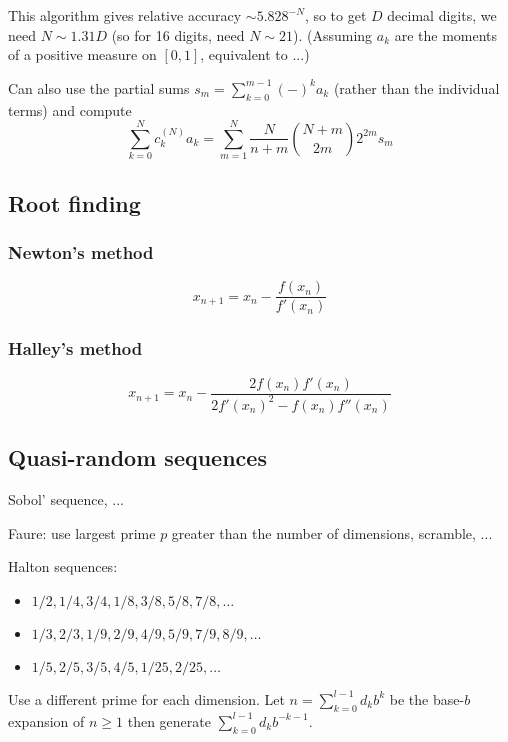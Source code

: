 \documentclass[10pt,dvipdfmx,letterpaper,twoside]{article}
\begin{document}
This algorithm gives relative accuracy $\sim 5.828^{-N}$, so to get $D$ decimal digits,
we need $N\sim 1.31 D$ (so for 16 digits, need $N\sim21$).  (Assuming $a_k$ are the moments
of a positive measure on $[0,1]$, equivalent to ...)

Can also use the partial sums $s_m=\sum_{k=0}^{m-1}(-)^k a_k$ (rather than the individual terms) and compute
\[ \sum_{k=0}^N c^{(N)}_k a_k = \sum_{m=1}^N \frac{N}{n+m}\binom{N+m}{2m} 2^{2m} s_m \]

\subsection{Root finding}

\subsubsection{Newton's method}
\[ x_{n+1} = x_n - \frac{f(x_n)}{f'(x_n)} \]

\subsubsection{Halley's method}
\[ x_{n+1} = x_n - \frac{2f(x_n)f'(x_n)}{2f'(x_n)^2 - f(x_n)f''(x_n)} \]

\subsection{Quasi-random sequences}

Sobol' sequence, ...

Faure: use largest prime $p$ greater than the number of dimensions, scramble, ...

Halton sequences:
\begin{itemize}
  \item $1/2,1/4,3/4,1/8,3/8,5/8,7/8,\dots$
  \item $1/3,2/3,1/9,2/9,4/9,5/9,7/9,8/9,\dots$
  \item $1/5,2/5,3/5,4/5,1/25,2/25,\dots$
\end{itemize}
Use a different prime for each dimension.
Let $n=\sum_{k=0}^{l-1}d_k b^k$ be the base-$b$ expansion of $n\geq1$ then generate $\sum_{k=0}^{l-1} d_k b^{-k-1}$.

\end{document}
